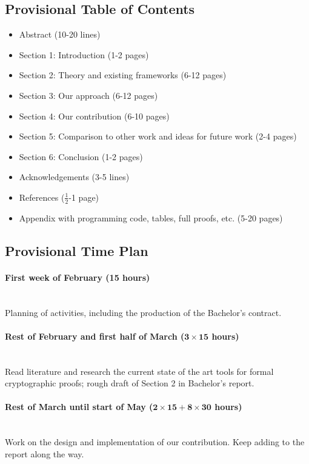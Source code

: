 \documentclass{article}
\newcommand{\timeest}[1]{$\mathbf{#1}$}%
\begin{document}
\subsection*{Provisional Table of Contents}
\begin{itemize}
    \item Abstract (10-20 lines)
    \item Section 1: Introduction (1-2 pages)
    \item Section 2: Theory and existing frameworks (6-12 pages)
    \item Section 3: Our approach (6-12 pages)
    \item Section 4: Our contribution (6-10 pages)
    \item Section 5: Comparison to other work and ideas for future work (2-4 pages)
    \item Section 6: Conclusion (1-2 pages)
    \item Acknowledgements (3-5 lines)
    \item References ($\frac{1}{2}$-1 page)
    \item Appendix with programming code, tables, full proofs, etc. (5-20 pages)
\end{itemize}

\subsection*{Provisional Time Plan}

\paragraph{First week of February (15 hours)}~\\\noindent
Planning of activities, including the production of the Bachelor's contract.

\paragraph{Rest of February and first half of March (\timeest{3\times 15} hours)}~\\\noindent
Read literature and research the current state of the art tools for formal
cryptographic proofs; rough draft of Section 2 in Bachelor's report.

\paragraph{Rest of March until start of May (\timeest{2\times 15+8\times 30} hours)}~\\\noindent
Work on the design and implementation of our contribution. Keep adding to the report
along the way. 
\end{document}
